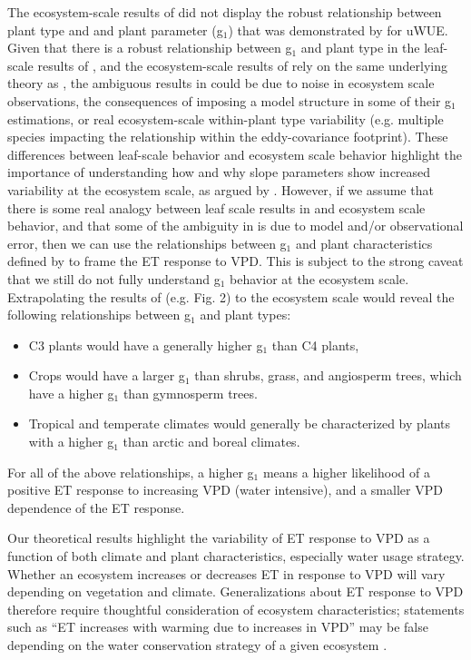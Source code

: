 \documentclass[draft]{agujournal2019}
\begin{document}
The ecosystem-scale results of  did not display the
robust relationship between plant type and and plant parameter (g$_1$)
that was demonstrated by  for uWUE. Given that there
is a robust relationship between g$_1$ and plant type in the
leaf-scale results of , and the ecosystem-scale
results of  rely on the same underlying theory as
, the ambiguous results in 
could be due to noise in ecosystem scale observations, the
consequences of imposing a model structure in some of their g$_1$
estimations, or real ecosystem-scale within-plant type variability
(e.g. multiple species impacting the relationship within the
eddy-covariance footprint). These differences between leaf-scale
behavior and ecosystem scale behavior highlight the importance of
understanding how and why slope parameters show increased variability
at the ecosystem scale, as argued by . However, if
we assume that there is some real analogy between leaf scale results
in  and ecosystem scale behavior, and that some of the
ambiguity in  is due to model and/or observational
error, then we can use the relationships between g$_1$ and plant
characteristics defined by  to frame the ET response
to VPD. This is subject to the strong caveat that we still do not
fully understand g$_1$ behavior at the ecosystem scale. Extrapolating
the results of  (e.g. Fig. 2) to the ecosystem scale
would reveal the following relationships between g$_1$ and plant
types:

\begin{itemize}
  \item C3 plants would have a generally higher g$_1$ than C4 plants,
  \item Crops would have a larger g$_1$ than shrubs, grass, and
    angiosperm trees, which have a higher g$_1$ than gymnosperm
    trees.
  \item Tropical and temperate climates would generally be
    characterized by plants with a higher g$_1$ than arctic and boreal
    climates.
\end{itemize}
For all of the above relationships, a higher g$_1$ means a higher
likelihood of a positive ET response to increasing VPD (water
intensive), and a smaller VPD dependence of the ET response.

Our theoretical results highlight the variability of ET
response to VPD as a function of both climate  and plant
characteristics, especially water usage strategy. Whether an
ecosystem increases or decreases ET in response to VPD will vary
depending on vegetation and climate. Generalizations about ET response
to VPD therefore require thoughtful consideration of ecosystem
characteristics; statements such as ``ET increases with warming due to
increases in VPD'' may be false depending on the water conservation
strategy of a given ecosystem \cite{Lemordant_2018}.
\end{document}
